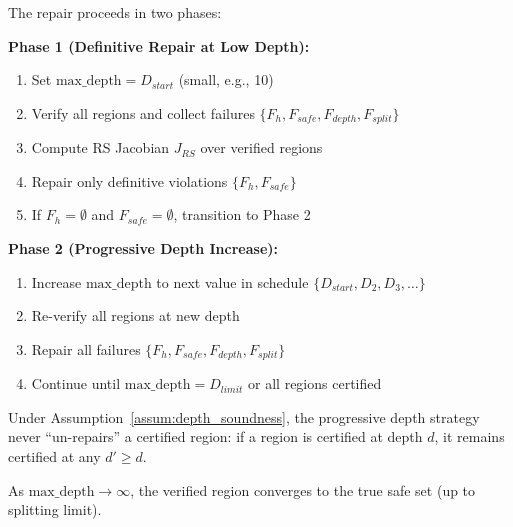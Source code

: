\begin{protocol}
    \label{prot:phased_repair}
    The repair proceeds in two phases:

    \textbf{Phase 1 (Definitive Repair at Low Depth):}
    \begin{enumerate}
        \item Set $\text{max\_depth} = D_{start}$ (small, e.g., 10)
        \item Verify all regions and collect failures $\{F_h, F_{safe}, F_{depth}, F_{split}\}$
        \item Compute RS Jacobian $J_{RS}$ over verified regions
        \item Repair only definitive violations $\{F_h, F_{safe}\}$
        \item If $F_h = \emptyset$ and $F_{safe} = \emptyset$, transition to Phase 2
    \end{enumerate}

    \textbf{Phase 2 (Progressive Depth Increase):}
    \begin{enumerate}
        \item Increase $\text{max\_depth}$ to next value in schedule $\{D_{start}, D_2, D_3, \ldots\}$
        \item Re-verify all regions at new depth
        \item Repair all failures $\{F_h, F_{safe}, F_{depth}, F_{split}\}$
        \item Continue until $\text{max\_depth} = D_{limit}$ or all regions certified
    \end{enumerate}
\end{protocol}

\begin{property}
    Under Assumption~\ref{assum:depth_soundness}, the progressive depth strategy never ``un-repairs'' a certified region: if a region is certified at depth $d$, it remains certified at any $d' \geq d$.
\end{property}

\begin{property}
    As $\text{max\_depth} \to \infty$, the verified region converges to the true safe set (up to splitting limit).
\end{property}

